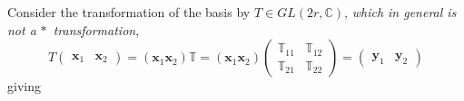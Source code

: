 \documentclass[aps, preprint]{revtex4}
\begin{document}
Consider the transformation of the basis by $T \in G L \left (2 r ,\mathbb{C}\right )\text{,}$ \emph{which in general is not a }$ \ast $\emph{\ transformation},
\begin{equation}T \left (\begin{array}{cc}\mathbf{x}_{1} & \mathbf{x}_{2}\end{array}\right ) =\left (\mathbf{x}_{1} \mathbf{x}_{2}\right ) \mathbb{T} =\left (\mathbf{x}_{1} \mathbf{x}_{2}\right ) \left (\begin{array}{cc}\mathbb{T}_{1 1} & \mathbb{T}_{1 2} \\
\mathbb{T}_{2 1} & \mathbb{T}_{2 2}\end{array}\right ) =\left (\begin{array}{cc}\mathbf{y}_{1} & \mathbf{y}_{2}\end{array}\right )
\end{equation}giving
\end{document}
